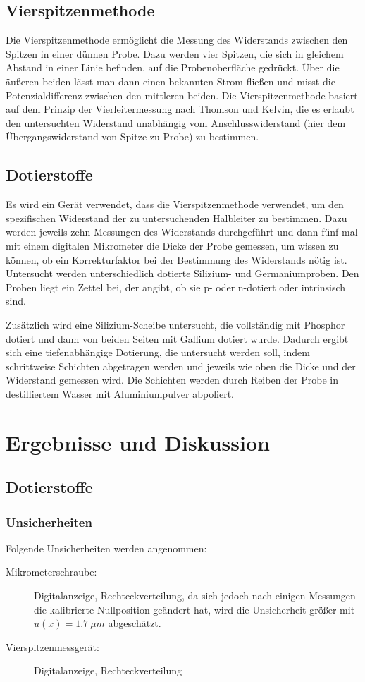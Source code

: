 \documentclass[
	a4paper,
	12pt,
	pagesize,
	ngerman
]{scrartcl}
\begin{document}
	\subsection{Vierspitzenmethode}
	Die Vierspitzenmethode ermöglicht die Messung des Widerstands zwischen den Spitzen in einer dünnen Probe.
	Dazu werden vier Spitzen, die sich in gleichem Abstand in einer Linie befinden, auf die Probenoberfläche gedrückt.
	Über die äußeren beiden lässt man dann einen bekannten Strom fließen und misst die Potenzialdifferenz zwischen den mittleren beiden.
	Die Vierspitzenmethode basiert auf dem Prinzip der Vierleitermessung nach Thomson und Kelvin, die es erlaubt den untersuchten Widerstand unabhängig vom Anschlusswiderstand (hier dem Übergangswiderstand von Spitze zu Probe) zu bestimmen.

	\subsection{Dotierstoffe}
	Es wird ein Gerät verwendet, dass die Vierspitzenmethode verwendet, um den spezifischen Widerstand der zu untersuchenden Halbleiter zu bestimmen.
	Dazu werden jeweils zehn Messungen des Widerstands durchgeführt und dann fünf mal mit einem digitalen Mikrometer die Dicke der Probe gemessen, um wissen zu können, ob ein Korrekturfaktor bei der Bestimmung des Widerstands nötig ist.
	Untersucht werden unterschiedlich dotierte Silizium- und Germaniumproben.
	Den Proben liegt ein Zettel bei, der angibt, ob sie p- oder n-dotiert oder intrinsisch sind.

	Zusätzlich wird eine Silizium-Scheibe untersucht, die vollständig mit Phosphor dotiert und dann von beiden Seiten mit Gallium dotiert wurde.
	Dadurch ergibt sich eine tiefenabhängige Dotierung, die untersucht werden soll, indem schrittweise Schichten abgetragen werden und jeweils wie oben die Dicke und der Widerstand gemessen wird.
	Die Schichten werden durch Reiben der Probe in destilliertem Wasser mit Aluminiumpulver abpoliert.

	\section{Ergebnisse und Diskussion}

	\subsection{Dotierstoffe}
	\subsubsection{Unsicherheiten}
	Folgende Unsicherheiten werden angenommen:
	\begin{description}
		\item[Mikrometerschraube:]  Digitalanzeige, Rechteckverteilung, da sich jedoch nach einigen Messungen die kalibrierte Nullposition geändert hat, wird die Unsicherheit größer mit $u(x)=\SI{1.7}{\mu m}$ abgeschätzt.
		\item[Vierspitzenmessgerät:] Digitalanzeige, Rechteckverteilung
	\end{description}
\end{document}

